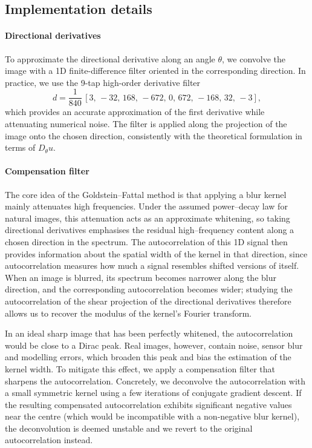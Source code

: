 \documentclass[a4paper,11pt]{article}
\begin{document}
 \subsection*{Implementation details}

\paragraph{Directional derivatives}
To approximate the directional derivative along an angle $\theta$, we convolve the image with a 1D finite-difference filter oriented in the corresponding direction. In practice, we use the 9-tap high-order derivative filter
\[
d = \frac{1}{840}\,[3,\,-32,\,168,\,-672,\,0,\,672,\,-168,\,32,\,-3],
\]
which provides an accurate approximation of the first derivative while attenuating numerical noise. The filter is applied along the projection of the image onto the chosen direction, consistently with the theoretical formulation in terms of $D_\theta u$.

\paragraph{Compensation filter}
The core idea of the Goldstein--Fattal method is that applying a blur kernel mainly attenuates high frequencies. Under the assumed power–decay law for natural images, this attenuation acts as an approximate whitening, so taking directional derivatives emphasises the residual high–frequency content along a chosen direction in the spectrum. The autocorrelation of this 1D signal then provides information about the spatial width of the kernel in that direction, since autocorrelation measures how much a signal resembles shifted versions of itself. When an image is blurred, its spectrum becomes narrower along the blur direction, and the corresponding autocorrelation becomes wider; studying the autocorrelation of the shear projection of the directional derivatives therefore allows us to recover the modulus of the kernel’s Fourier transform.

In an ideal sharp image that has been perfectly whitened, the autocorrelation would be close to a Dirac peak. Real images, however, contain noise, sensor blur and modelling errors, which broaden this peak and bias the estimation of the kernel width. To mitigate this effect, we apply a compensation filter that sharpens the autocorrelation. Concretely, we deconvolve the autocorrelation with a small symmetric kernel using a few iterations of conjugate gradient descent. If the resulting compensated autocorrelation exhibits significant negative values near the centre (which would be incompatible with a non-negative blur kernel), the deconvolution is deemed unstable and we revert to the original autocorrelation instead.
\end{document}
